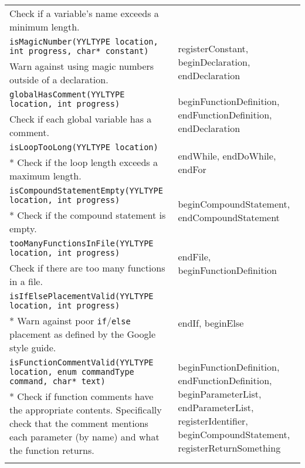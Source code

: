 \documentclass[12pt]{report}
\begin{document}
\begin{longtable}{p{9.5cm} p{\saxColSize}}
		 Check if a variable's name exceeds a minimum length. \vspace{\vertSize} \\
		\lstinline!isMagicNumber(YYLTYPE location, int progress, char* constant)! & \multirow{2}{\saxColSize}{registerConstant, beginDeclaration, endDeclaration} \\*
			 Warn against using magic numbers outside of a declaration. \vspace{\vertSize} \\
		\lstinline!globalHasComment(YYLTYPE location, int progress)! & \multirow{2}{\saxColSize}{beginFunctionDefinition, endFunctionDefinition, endDeclaration} \\*
			 Check if each global variable has a comment. \vspace{\vertSize} \\ 
		\lstinline!isLoopTooLong(YYLTYPE location)! & \multirow{2}{\saxColSize}{endWhile, endDoWhile, endFor} \\ *
			Check if the loop length exceeds a maximum length. \vspace{\vertSize} \\
		\lstinline!isCompoundStatementEmpty(YYLTYPE location, int progress)!  & \multirow{2}{\saxColSize}{beginCompoundStatement, endCompoundStatement} \\ *
			Check if the compound statement is empty. \vspace{\vertSize} \\
		\lstinline!tooManyFunctionsInFile(YYLTYPE location, int progress)! & \multirow{2}{\saxColSize}{endFile, beginFunctionDefinition} \\*
			 Check if there are too many functions in a file. \vspace{\vertSize} \\
		\lstinline!isIfElsePlacementValid(YYLTYPE location, int progress)! & \multirow{2}{\saxColSize}{endIf, beginElse} \\ *
			Warn against poor \lstinline!if!\slash\lstinline!else! placement as defined by the Google style guide. \vspace{\vertSize} \\
		\lstinline!isFunctionCommentValid(YYLTYPE location, enum commandType command, char* text)! & \multirow{2}{\saxColSize}{beginFunctionDefinition, endFunctionDefinition, beginParameterList, endParameterList, registerIdentifier, beginCompoundStatement, registerReturnSomething} \\ *
			Check if function comments have the appropriate contents. Specifically check that the comment mentions each parameter (by name) and what the function returns. \vspace{\vertSize}  \\ \\

\end{longtable}
\end{document}
